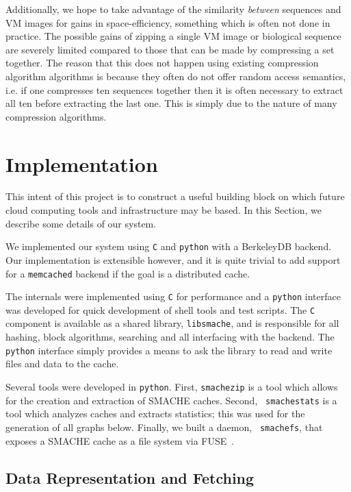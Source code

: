 \documentclass{sigplanconf}[11pt]
\begin{document}
Additionally, we hope to take advantage of the similarity {\em between}
sequences and VM images for gains in space-efficiency, something which is often
not done in practice.  The possible gains of zipping a single VM image or
biological sequence are severely limited compared to those that can be made by
compressing a set together.  The reason that this does not happen using
existing compression algorithm algorithms is because they often do not offer
random access semantics, i.e. if one compresses ten sequences together then it
is often necessary to extract all ten before extracting the last one.  This is
simply due to the nature of many compression algorithms.

\section{Implementation}
\label{sec:implementation}

This intent of this project is to construct a useful building block on which
future cloud computing tools and infrastructure may be based.  In this Section,
we describe some details of our system.

We implemented our system using {\tt C} and {\tt python} with a BerkeleyDB
backend.  Our implementation is extensible however, and it is quite trivial to
add support for a {\tt memcached} backend if the goal is a distributed cache.

The internals were implemented using {\tt C} for performance and a {\tt python}
interface was developed for quick development of shell tools and test scripts.
The {\tt C} component is available as a shared library, {\tt libsmache}, and is
responsible for all hashing, block algorithms, searching and all interfacing
with the backend.  The {\tt python} interface simply provides a means to
ask the library to read and write files and data to the cache.

Several tools were developed in {\tt python}. First, {\tt smachezip} is a tool
which allows for the creation and extraction of SMACHE caches.  Second, {\tt
smachestats} is a tool which analyzes caches and extracts statistics; this was
used for the generation of all graphs below.  Finally, we built a daemon, {\tt
smachefs}, that exposes a SMACHE cache as a file system via FUSE~\cite{fuse}. 

\subsection{Data Representation and Fetching}
\end{document}
